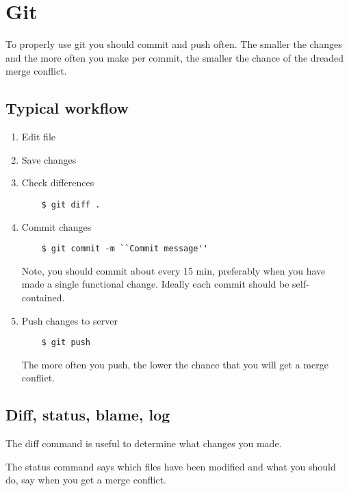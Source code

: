 \chapter{Git}
\label{git}

To properly use git you should commit and push often. The smaller the
changes and the more often you make per commit, the smaller the chance
of the dreaded merge conflict.


\section{Typical workflow}

\begin{enumerate}
\item Edit file

\item Save changes  

\item Check differences
  
\begin{verbatim}  
    $ git diff .
\end{verbatim}
  
\item Commit changes 

\begin{verbatim}  
    $ git commit -m ``Commit message''
\end{verbatim}

Note, you should commit about every 15 min, preferably when you have
made a single functional change.  Ideally each commit should be
self-contained.
  
\item Push changes to server

\begin{verbatim}    
    $ git push
\end{verbatim}

The more often you push, the lower the chance that you will get a
merge conflict.
  
\end{enumerate}


\section{Diff, status, blame, log}

The diff command is useful to determine what changes you made.

The status command says which files have been modified and what you
should do, say when you get a merge conflict.


